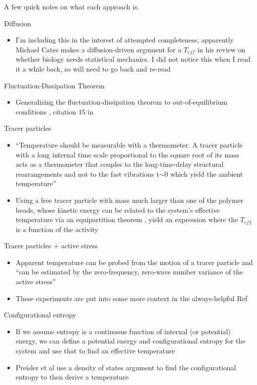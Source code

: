 \documentclass[11pt]{article}   	%
\begin{document}
A few quick notes on what each approach is.

Diffusion
\begin{itemize}
\item I'm including this in the interest of attempted completeness; apparently Michael Cates makes a diffusion-driven argument for a $T_{eff}$ in his review on whether biology needs statistical mechanics. I did not notice this when I read it a while back, so will need to go back and re-read
\end{itemize}

Fluctuation-Dissipation Theorem
\begin{itemize}
\item Generalizing the fluctuation-dissipation theorem to out-of-equilibrium conditions \cite{LoiEA_2011_SoftMatter}, citation 15 in \cite{LoiEA_2011_SoftMatter}
\end{itemize}

Tracer particles
\begin{itemize}
\item ``Temperature should be measurable with a thermometer. A tracer particle with a long internal time scale proportional to the square root of its mass acts as a thermometer that couples to the long-time-delay structural rearrangements and not to the fast vibrations t$\sim$0 which yield the ambient temperature'' \cite{LoiEA_2008_PRE}
\item Using a free tracer particle with mass much larger than one of the polymer beads, whose kinetic energy can be related to the system's effective temperature via an equipartition theorem \cite{LoiEA_2011_SoftMatter}, yield an expression where the $T_{eff}$ is a function of the activity
\end{itemize}

Tracer particles + active stress
\begin{itemize}
\item Apparent temperature can be probed from the motion of a tracer particle and ``can be estimated by the zero-frequency, zero-wave number variance of the active stress''
\item These experiments are put into some more context in the always-helpful Ref \cite{MarchettiEA_2013_RevModPhys}
\end{itemize}

Configurational entropy
\begin{itemize}
\item If we assume entropy is a continuous function of internal (or potential) energy, we can define a potential energy and configurational entropy for the system and use that to find an effective temperature
\item Preisler et al use a density of states argument to find the configurational entropy to then derive a temperature \cite{PreislerDijkstra_2016_SoftMatter}
\end{itemize}
\end{document}
